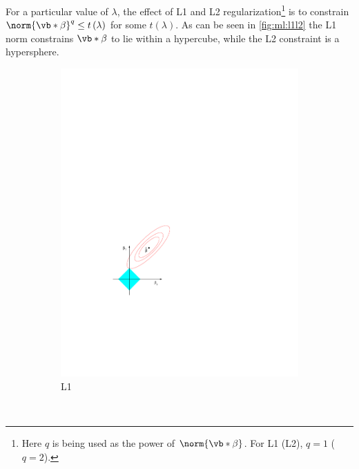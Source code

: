For a particular value of $\lambda$, the effect of L1 and L2 regularization\footnote{Here
$q$ is being used as the power of $\norm{\vb*{\beta}}$. For L1 (L2), $q=1$ ($q=2$).} is
to constrain $\norm{\vb*{\beta}}^{q} \leq t\left(\lambda\right)$ for some $t\left(\lambda\right)$.
As can be seen in \cref{fig:ml:l1l2} the L1 norm constrains $\vb*{\beta}$ to lie within a hypercube,
while the L2 constraint is a hypersphere.

\begin{figure}[H]
  \centering
  \begin{subfigure}[b]{0.48\textwidth}\centering
      \includegraphics[width=\textwidth]{figures/ml/l1}
  \caption{L1}
  \label{fig:ml:l1l2:l1}
  \end{subfigure}
  ~
  \begin{subfigure}[b]{0.48\textwidth}\centering

\end{subfigure}
\end{figure}
